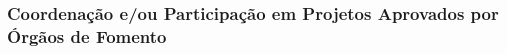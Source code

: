\documentclass[a4paper,oneside,10pt]{article}
\begin{document}
\begin{enumerate}
%
%

%
%
%
%
%
%
%
%
%
%


\end{enumerate}

\subsubsection{Coordena\c{c}\~{a}o e/ou Participa\c{c}\~{a}o em Projetos Aprovados por \'{O}rg\~{a}os de Fomento}
\vspace{0.3cm}
\end{document}
